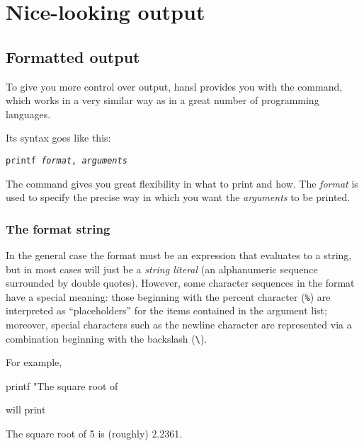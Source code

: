 \chapter{Nice-looking output}
\label{chap:formatting}

\section{Formatted output}
\label{sec:printf}

To give you more control over output, hansl provides you with the
 command, which works in a very similar way as in a great
number of programming languages.

Its syntax goes like this:
\begin{flushleft}
  \texttt{printf \emph{format}, \emph{arguments}}
\end{flushleft}

The  command gives you great flexibility in what to
print and how. The \emph{format} is used to specify the precise
way in which you want the \emph{arguments} to be printed.

\subsection{The format string}
\label{sec:fmtstring}

In the general case the  format must be an expression that
evaluates to a string, but in most cases will just be a \textit{string
  literal} (an alphanumeric sequence surrounded by double
quotes). However, some character sequences in the format have a
special meaning: those beginning with the percent character
(\texttt{\%}) are interpreted as ``placeholders'' for the items
contained in the argument list; moreover, special characters such as
the newline character are represented via a combination beginning with
the backslash (\verb|\|).

For example,
\begin{code}
printf "The square root of %
\end{code}
will print 
\begin{code}
The square root of 5 is (roughly) 2.2361.
\end{code}

